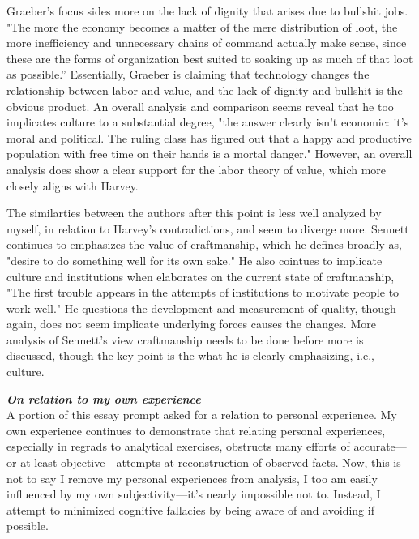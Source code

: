 \documentclass[12pt,a4paper]{article}
\begin{document}
Graeber's focus sides more on the lack of dignity that arises due to bullshit jobs. "The more the economy becomes a matter of the mere distribution of loot, the more inefficiency and unnecessary chains of command actually make sense, since these are the forms of organization best suited to soaking up as much of that loot as possible.” \cite{bs} Essentially, Graeber is claiming that technology changes the relationship between labor and value, and the lack of dignity and bullshit is the obvious product. An overall analysis and comparison seems reveal that he too implicates culture to a substantial degree, "the answer clearly isn't economic: it's moral and political. The ruling class has figured out that a happy and productive population with free time on their hands is a mortal danger." \cite{bs} However, an overall analysis does show a clear support for the labor theory of value, which more closely aligns with Harvey. 
\vspace*{10pt}

The similarties between the authors after this point is less well analyzed by myself, in relation to Harvey's contradictions, and seem to diverge more. Sennett continues to emphasizes the value of craftmanship, which he defines broadly as, "desire to do something well for its own sake." \cite{craft} He also cointues to implicate culture and institutions when elaborates on the current state of craftmanship, "The first trouble appears in the attempts of institutions to motivate people to work well." \cite{craft} He questions the development and measurement of quality, though again, does not seem implicate underlying forces causes the changes. More analysis of Sennett's view craftmanship needs to be done before more is discussed, though the key point is the what he is clearly emphasizing, i.e., culture. 

\textit{\textbf{On relation to my own experience}}\\
A portion of this essay prompt asked for a relation to personal experience. My own experience continues to demonstrate that relating personal experiences, especially in regrads to analytical exercises, obstructs many efforts of accurate---or at least objective---attempts at reconstruction of observed facts. Now, this is not to say I remove my personal experiences from analysis, I too am easily influenced by my own subjectivity---it's nearly impossible not to. Instead, I attempt to minimized cognitive fallacies by being aware of and avoiding if possible.
\end{document}
